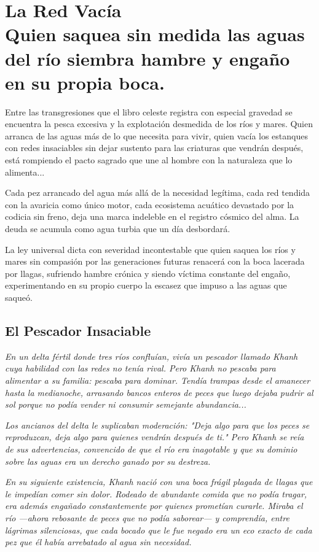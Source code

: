 \chapter[La Red Vacía]{La Red Vacía\\ \large Quien saquea sin medida las aguas del río siembra hambre y engaño en su propia boca.}


\lettrine[lines=3, nindent=0.5em, findent=0.2em]{E}{}ntre las transgresiones que el libro celeste registra con especial gravedad se encuentra la pesca excesiva y la explotación desmedida de los ríos y mares. Quien arranca de las aguas más de lo que necesita para vivir, quien vacía los estanques con redes insaciables sin dejar sustento para las criaturas que vendrán después, está rompiendo el pacto sagrado que une al hombre con la naturaleza que lo alimenta...

Cada pez arrancado del agua más allá de la necesidad legítima, cada red tendida con la avaricia como único motor, cada ecosistema acuático devastado por la codicia sin freno, deja una marca indeleble en el registro cósmico del alma. La deuda se acumula como agua turbia que un día desbordará.

La ley universal dicta con severidad incontestable que quien saquea los ríos y mares sin compasión por las generaciones futuras renacerá con la boca lacerada por llagas, sufriendo hambre crónica y siendo víctima constante del engaño, experimentando en su propio cuerpo la escasez que impuso a las aguas que saqueó.

\section{El Pescador Insaciable}
\begin{elegantquote}
\textit{En un delta fértil donde tres ríos confluían, vivía un pescador llamado Khanh cuya habilidad con las redes no tenía rival. Pero Khanh no pescaba para alimentar a su familia: pescaba para dominar. Tendía trampas desde el amanecer hasta la medianoche, arrasando bancos enteros de peces que luego dejaba pudrir al sol porque no podía vender ni consumir semejante abundancia...}

\textit{Los ancianos del delta le suplicaban moderación: "Deja algo para que los peces se reproduzcan, deja algo para quienes vendrán después de ti." Pero Khanh se reía de sus advertencias, convencido de que el río era inagotable y que su dominio sobre las aguas era un derecho ganado por su destreza.}

\textit{En su siguiente existencia, Khanh nació con una boca frágil plagada de llagas que le impedían comer sin dolor. Rodeado de abundante comida que no podía tragar, era además engañado constantemente por quienes prometían curarle. Miraba el río —ahora rebosante de peces que no podía saborear— y comprendía, entre lágrimas silenciosas, que cada bocado que le fue negado era un eco exacto de cada pez que él había arrebatado al agua sin necesidad.}

\end{elegantquote}

